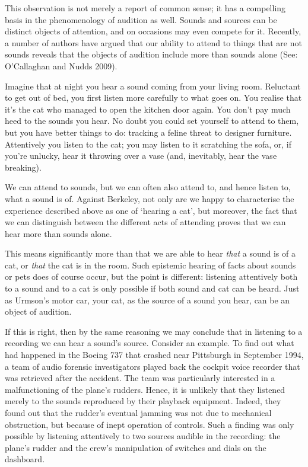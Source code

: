 \documentclass[sloppy, journal, git, anonymise]{humapap}
\begin{document}
This observation is not merely a report of common sense; it has a
compelling basis in the phenomenology of audition as well. Sounds and
sources can be distinct objects of attention, and on occasions may even
compete for it. Recently, a number of authors have argued that our
ability to attend to things that are not sounds reveals that the objects
of audition include more than sounds alone (See: O'Callaghan and Nudds
2009).

Imagine that at night you hear a sound coming from your living room.
Reluctant to get out of bed, you first listen more carefully to what
goes on. You realise that it's the cat who managed to open the kitchen
door again. You don't pay much heed to the sounds you hear. No doubt you
could set yourself to attend to them, but you have better things to do:
tracking a feline threat to designer furniture. Attentively you listen
to the cat; you may listen to it scratching the sofa, or, if you're
unlucky, hear it throwing over a vase (and, inevitably, hear the vase
breaking).

We can attend to sounds, but we can often also attend to, and hence
listen to, what a sound is of. Against Berkeley, not only are we happy
to characterise the experience described above as one of `hearing a
cat', but moreover, the fact that we can distinguish between the
different acts of attending proves that we can hear more than sounds
alone.

This means significantly more than that we are able to hear \emph{that}
a sound is of a cat, or \emph{that} the cat is in the room. Such
epistemic hearing of facts about sounds or pets does of course occur,
but the point is different: listening attentively both to a sound and to
a cat is only possible if both sound and cat can be heard. Just as
Urmson's motor car, your cat, as the source of a sound you hear, can be
an object of audition.

If this is right, then by the same reasoning we may conclude that in
listening to a recording we can hear a sound's source. Consider an
example. To find out what had happened in the Boeing 737 that crashed
near Pittsburgh in September 1994, a team of audio forensic
investigators played back the cockpit voice recorder that was retrieved
after the accident. The team was particularly interested in a
malfunctioning of the plane's rudders. Hence, it is unlikely that they
listened merely to the sounds reproduced by their playback equipment.
Indeed, they found out that the rudder's eventual jamming was not due to
mechanical obstruction, but because of inept operation of controls. Such
a finding was only possible by listening attentively to two sources
audible in the recording: the plane's rudder and the crew's manipulation
of switches and dials on the dashboard.
\end{document}
